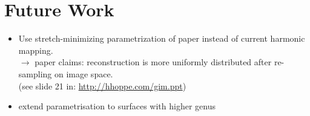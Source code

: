 \section{Future Work}
\begin{itemize}
\item Use stretch-minimizing parametrization of paper \cite{gu2002geometry} instead of current harmonic mapping. \\
$\rightarrow$ paper claims: reconstruction is more uniformly distributed after re-sampling on image space.\\ (see slide 21 in: \url{http://hhoppe.com/gim.ppt})
 
\item extend parametrisation to surfaces with higher genus
\end{itemize}